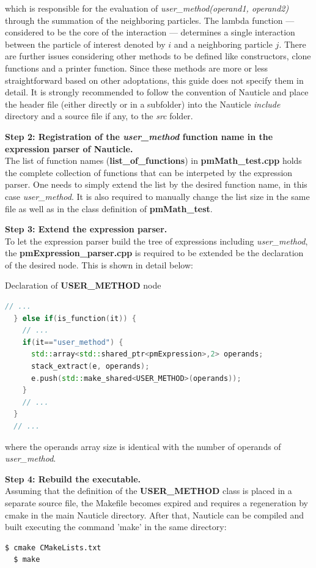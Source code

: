 \documentclass[a4paper,12pt,openany]{book}
\theoremstyle{break}
\begin{document}
which is responsible for the evaluation of \textit{user\_method(operand1, operand2)} through the summation of the neighboring particles. The lambda function --- considered to be the core of the interaction --- determines a single interaction between the particle of interest denoted by $i$ and a neighboring particle $j$. There are further issues considering other methods to be defined like constructors, clone functions and a printer function. Since these methods are more or less straightforward based on other adoptations, this guide does not specify them in detail. It is strongly recommended to follow the convention of Nauticle and place the header file (either directly or in a subfolder) into the Nauticle \textit{include} directory and a source file if any, to the \textit{src} folder.

\textbf{Step 2: Registration of the \textit{user\_method} function name in the expression parser of Nauticle.} \\
The list of function names (\textbf{list\_of\_functions}) in \textbf{pmMath\_test.cpp} holds the complete collection of functions that can be interpeted by the expression parser. One needs to simply extend the list by the desired function name, in this case \textit{user\_method}. It is also required to manually change the list size in the same file as well as in the class definition of \textbf{pmMath\_test}.

\textbf{Step 3: Extend the expression parser.} \\
To let the expression parser build the tree of expressions including \textit{user\_method}, the \textbf{pmExpression\_parser.cpp} is required to be extended be the declaration of the desired node. This is shown in detail below:
\begin{example}{Declaration of \textbf{USER\_METHOD} node}{}
\lstset{basicstyle=\tiny}
\begin{lstlisting}[language=c++]
  // ...
  } else if(is_function(it)) {
    // ...
    if(it=="user_method") {
      std::array<std::shared_ptr<pmExpression>,2> operands;
      stack_extract(e, operands);
      e.push(std::make_shared<USER_METHOD>(operands));
    }
    // ...
  }
  // ...
\end{lstlisting}
\end{example}
where the operands array size is identical with the number of operands of \textit{user\_method}.

\textbf{Step 4: Rebuild the executable.} \\
Assuming that the definition of the \textbf{USER\_METHOD} class is placed in a separate source file, the Makefile becomes expired and requires a regeneration by cmake in the main Nauticle directory. After that, Nauticle can be compiled and built executing the command 'make' in the same directory:
\begin{lstlisting}[language=bash]
  $ cmake CMakeLists.txt
  $ make
\end{lstlisting}
\end{document}
